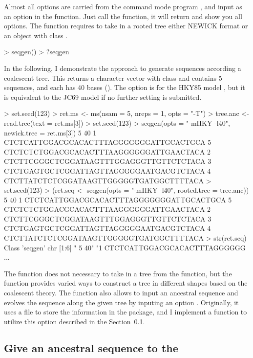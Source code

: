 Almost all options are carried from the command mode program ,
and input as an option  in the  function.
Just call the function, it will return and show you all options.
The  function requires to take in a rooted tree either NEWICK
format or an object with class .
\begin{Code}
> seqgen()
> ?seqgen
\end{Code}

In the following, I demonstrate the  approach
to generate sequences according a coalescent tree. This returns a character
vector with class {\color{red} } and contains 5 sequences, and
each has 40 bases (). The option  is for the HKY85
model \citep{Hasegawa1985},
but it is equivalent to the JC69 model \citep{Jukes1969} if no further
setting is submitted.
\begin{Code}
> set.seed(123)
> ret.ms <- ms(nsam = 5, nreps = 1, opts = "-T")
> tree.anc <- read.tree(text = ret.ms[3])
> set.seed(123)
> seqgen(opts = "-mHKY -l40", newick.tree = ret.ms[3])
 5 40
1         CTCTCATTGGACGCACACTTTAGGGGGGGATTGCACTGCA
5         CTCTCTCTGGACGCACACTTTAAGGGGGGATTGAACTACA
2         CTCTTCGGGCTCGGATAAGTTTGGAGGGTTGTTCTCTACA
3         CTCTGAGTGCTCGGATTAGTTAGGGGGAATGACGTCTACA
4         CTCTTATCTCTCGGATAAGTTGGGGGTGATGGCTTTTACA
> set.seed(123)
> (ret.seq <- seqgen(opts = "-mHKY -l40", rooted.tree = tree.anc))
 5 40
1         CTCTCATTGGACGCACACTTTAGGGGGGGATTGCACTGCA
5         CTCTCTCTGGACGCACACTTTAAGGGGGGATTGAACTACA
2         CTCTTCGGGCTCGGATAAGTTTGGAGGGTTGTTCTCTACA
3         CTCTGAGTGCTCGGATTAGTTAGGGGGAATGACGTCTACA
4         CTCTTATCTCTCGGATAAGTTGGGGGTGATGGCTTTTACA
> str(ret.seq)
Class 'seqgen'  chr [1:6] " 5 40" "1         CTCTCATTGGACGCACACTTTAGGGGGG ...
\end{Code}

The  function does not necessary to take in a tree from
the  function,
but the  function provides varied ways to construct a tree in
different shapes based on the coalescent theory.
The  function also allows to input an ancestral sequence and
evolves the sequence along the given tree by inputing an option .
Originally, it uses a file to store the information in the 
package, and I implement a function to utilize this option described in the
Section~\ref{sec:ancestral}.




\subsection[Give an ancestral sequence to the ms+seqgen]{Give an ancestral sequence to the }
\label{sec:ancestral}

